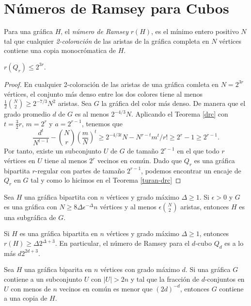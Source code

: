   \section{Números de Ramsey para Cubos}
  Para una gráfica $H$, el \textit{número de Ramsey} $r(H)$, es el
  mínimo entero positivo $N$ tal que cualquier \textit{2-coloración}
  de las aristas de la gráfica completa en $N$ vértices contiene una
  copia monocrómatica de $H$.
  \begin{theorem}
    $r(Q_r) \leq 2^{3r}$.
  \end{theorem}
  \begin{proof}
    En cualquier 2-coloración de las aristas de una gráfica comleta
    en $N = 2^{3r}$ vértices, el conjunto más denso entre los dos
    colores tiene al menos
    $\frac{1}{2} \binom{N}{2} \geq 2^{-7/3} N^2$ aristas. Sea $G$ la gráfica
    del color más denso. De manera que el grado promedio $d$ de $G$
    es al menos $2^{-4/3}N$. Aplicando el Teorema \ref{drc} con $t =
    \frac{3}{2}r$, $m = 2^r$ y $a = 2^{r-1}$, tenemos que
    $$\frac{d^t}{N^{t-1}} - \binom{N}{r} \left(\frac{m}{N}\right)^t
    \geq 2^{-4/3 t} N - N^{r-t}m^t / r! \geq 2^r - 1 \geq 2^{r-1}. $$
    Por tanto, existe un subconjunto $U$ de $G$ de tamaño $2^{r-1}$
    en el que todo $r$ vértices en $U$ tiene al menos $2^r$ vecinos en común.
    Dado que $Q_r$ es una gráfica bipartita $r$-regular con partes de
    tamaño $2^{r-1}$, podemos encontrar un encaje de $Q_r$ en $G$ tal
    y como lo hicimos en el Teorema \ref{turan-drc}
  \end{proof}

  \begin{theorem}
    Sea $H$ una gráfica bipartita con $n$ vértices y grado máximo
    $\Delta \ge 1$.
    Si $\epsilon > 0$ y $G$ es una gráfica con $N \ge 8\Delta
    \epsilon^{-\Delta}n$
    vértices y al menos $\epsilon \binom{N}{2}$ aristas, entonces $H$
    es una subgráfica
    de $G$.
  \end{theorem}

  \begin{corollary}
    Si $H$ es una gráfica bipartita en $n$ vértices y grado máximo
    $\Delta \ge 1$, entonces $r(H) \ge \Delta 2^{\Delta + 3}$. En particular,
    el número de Ramsey para el $d$-cubo $Q_d$ es a lo más $d 2^{2d + 3}$.
  \end{corollary}

  \begin{theorem}
    Sea $H$ una gráfica biparita en $n$ vértices con grado máximo
    $d$. Si una gráfica $G$ contiene a un subconjunto $U$ con $\vert
    U \vert > 2n$ y tal que la fracción de $d$-conjuntos en $U$ con
    menos de $n$ vecinos en común es menor que $(2d)^{-d}$, entonces
    $G$ contiene a una copia de $H$.
  \end{theorem}

